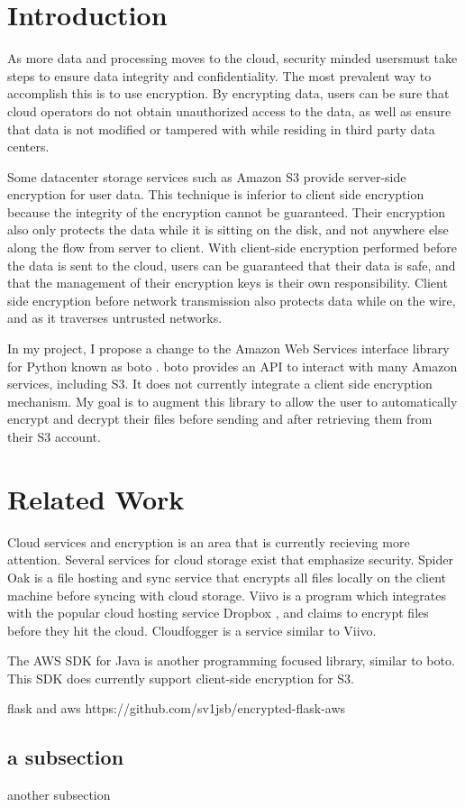 \section{Introduction}
As more data and processing moves to the cloud, security minded usersmust take steps to ensure data integrity and confidentiality.
The most prevalent way to accomplish this is to use encryption. 
By encrypting data, users can be sure that cloud operators do not
obtain unauthorized access to the data, as well as ensure that data is not modified or tampered with while residing in third party data centers.

Some datacenter storage services such as Amazon S3 \cite{Amazon-S3} provide server-side encryption for user data. This technique is inferior to client side encryption because the integrity of the encryption cannot be guaranteed.
Their encryption also only protects the data while it is sitting on the disk, and not anywhere else along the flow from server to client.
With client-side encryption performed before the data is sent to the cloud, users can be guaranteed that their data is safe, and that the management of their encryption keys is their own responsibility. 
Client side encryption before network transmission also protects data while on the wire, and as it traverses untrusted networks.

In my project, I propose a change to the Amazon Web Services interface library for Python known as boto \cite{boto}. boto provides an API to interact with many Amazon services, including S3. It does not currently integrate a client side encryption mechanism. My goal is to augment this library to allow the user to automatically encrypt and decrypt their files before sending and after retrieving them from their S3 account.

\section{Related Work}
Cloud services and encryption is an area that is currently recieving more attention. Several services for cloud storage exist that emphasize security. Spider Oak \cite{spideroak} is a file hosting and sync service that encrypts all files locally on the client machine before syncing with cloud storage. Viivo \cite{viivo} is a program which integrates with the popular cloud hosting service Dropbox \cite{dropbox}, and claims to encrypt files before they hit the cloud. Cloudfogger \cite{cloudfogger} is a service similar to Viivo.

The AWS SDK for Java \cite{aws-sdk-java} is another programming focused library, similar to boto. This SDK does currently support client-side encryption for S3.

flask and aws \cite{flask}
https://github.com/sv1jsb/encrypted-flask-aws


\subsection{a subsection}
another subsection

